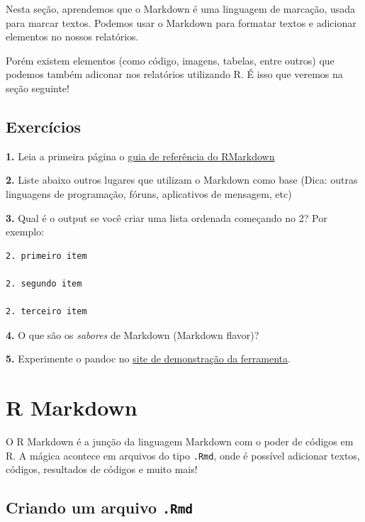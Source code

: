 \documentclass[
]{book}
\begin{document}
Nesta seção, aprendemos que o Markdown é uma linguagem de marcação, usada para marcar textos. Podemos usar o Markdown para formatar textos e adicionar elementos no nossos relatórios.

Porém existem elementos (como código, imagens, tabelas, entre outros) que podemos também adiconar nos relatórios utilizando R. É isso que veremos na seção seguinte!

\hypertarget{exercicios-md}{%
\subsection*{Exercícios}\label{exercicios-md}}

\textbf{1.} Leia a primeira página o \href{https://rstudio.com/wp-content/uploads/2015/03/rmarkdown-reference.pdf}{guia de referência do RMarkdown}

\textbf{2.} Liste abaixo outros lugares que utilizam o Markdown como base (Dica: outras linguagens de programação, fóruns, aplicativos de mensagem, etc)

\textbf{3.} Qual é o output se você criar uma lista ordenada começando no 2? Por exemplo:

\begin{verbatim}
2. primeiro item

2. segundo item

2. terceiro item
\end{verbatim}

\textbf{4.} O que são os \emph{sabores} de Markdown (Markdown flavor)?

\textbf{5.} Experimente o pandoc no \href{https://pandoc.org/try/}{site de demonstração da ferramenta}.

\hypertarget{r-markdown}{%
\section{R Markdown}\label{r-markdown}}

O R Markdown é a junção da linguagem Markdown com o poder de códigos em R. A mágica acontece em arquivos do tipo \texttt{.Rmd}, onde é possível adicionar textos, códigos, resultados de códigos e muito mais!

\hypertarget{criando-um-arquivo-.rmd}{%
\subsection{\texorpdfstring{Criando um arquivo \texttt{.Rmd}}{Criando um arquivo .Rmd}}\label{criando-um-arquivo-.rmd}}
\end{document}
